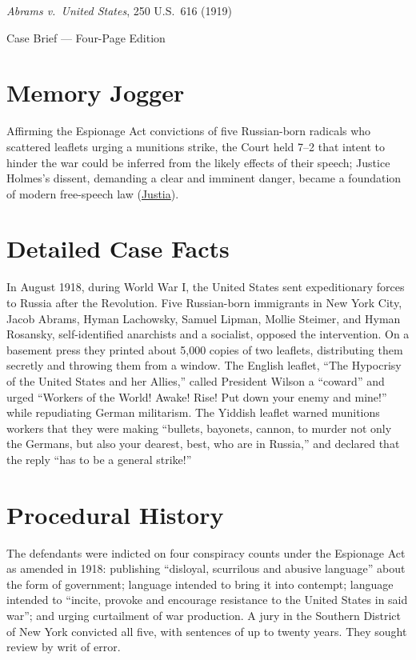 \documentclass[12pt]{article}
\begin{document}
\begin{center}
{\LARGE \textit{Abrams v.\ United States}, 250 U.S.\ 616 (1919)\par}
\vspace{0.8em}
{\large Case Brief --- Four-Page Edition\par}
\end{center}
\vspace{1em}

\section{Memory Jogger}

Affirming the Espionage Act convictions of five Russian-born radicals who scattered leaflets urging a munitions strike, the Court held 7--2 that intent to hinder the war could be inferred from the likely effects of their speech; Justice Holmes's dissent, demanding a clear and imminent danger, became a foundation of modern free-speech law (\href{https://supreme.justia.com/cases/federal/us/250/616/}{Justia}).

\section{Detailed Case Facts}

In August 1918, during World War I, the United States sent expeditionary forces to Russia after the Revolution. Five Russian-born immigrants in New York City, Jacob Abrams, Hyman Lachowsky, Samuel Lipman, Mollie Steimer, and Hyman Rosansky, self-identified anarchists and a socialist, opposed the intervention. On a basement press they printed about 5,000 copies of two leaflets, distributing them secretly and throwing them from a window. The English leaflet, ``The Hypocrisy of the United States and her Allies,'' called President Wilson a ``coward'' and urged ``Workers of the World! Awake! Rise! Put down your enemy and mine!'' while repudiating German militarism. The Yiddish leaflet warned munitions workers that they were making ``bullets, bayonets, cannon, to murder not only the Germans, but also your dearest, best, who are in Russia,'' and declared that the reply ``has to be a general strike!''

\section{Procedural History}

The defendants were indicted on four conspiracy counts under the Espionage Act as amended in 1918: publishing ``disloyal, scurrilous and abusive language'' about the form of government; language intended to bring it into contempt; language intended to ``incite, provoke and encourage resistance to the United States in said war''; and urging curtailment of war production. A jury in the Southern District of New York convicted all five, with sentences of up to twenty years. They sought review by writ of error.
\end{document}

